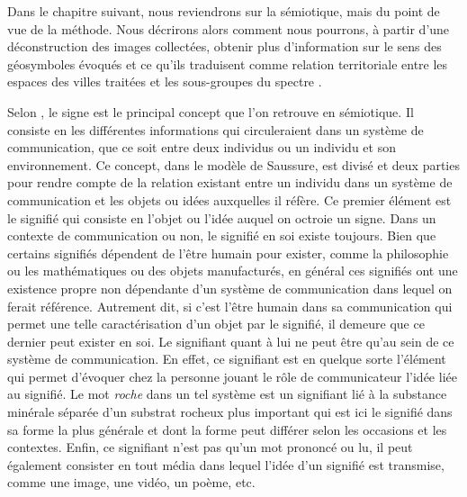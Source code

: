 Dans le chapitre suivant, nous reviendrons sur la sémiotique, mais du point de vue de la méthode. 
Nous décrirons alors comment nous pourrons, à partir d'une déconstruction des images collectées, obtenir plus d'information sur le sens des géosymboles évoqués et ce qu'ils traduisent comme relation territoriale entre les espaces des villes traitées et les sous-groupes du spectre \lgbt{}.

Selon \citet[113][]{Rose2012}, le signe est le principal concept que l'on retrouve en sémiotique. 
Il consiste en les différentes informations qui circuleraient dans un système de communication, que ce soit entre deux individus ou un individu et son environnement. 
Ce concept, dans le modèle de Saussure, est divisé et deux parties pour rendre compte de la relation existant entre un individu dans un système de communication et les objets ou idées auxquelles il réfère. 
Ce premier élément est le signifié qui consiste en l'objet ou l'idée auquel on octroie un signe. 
Dans un contexte de communication ou non, le signifié en soi existe toujours. 
Bien que certains signifiés dépendent de l'être humain pour exister, comme la philosophie ou les mathématiques ou des objets manufacturés, en général ces signifiés ont une existence propre non dépendante d'un système de communication dans lequel on ferait référence. 
Autrement dit, si c'est l'être humain dans sa communication qui permet une telle caractérisation d'un objet par le signifié, il demeure que ce dernier peut exister en soi. 
Le signifiant quant à lui ne peut être qu'au sein de ce système de communication. 
En effet, ce signifiant est en quelque sorte l'élément qui permet d'évoquer chez la personne jouant le rôle de communicateur l'idée liée au signifié. 
Le mot \emph{roche} dans un tel système est un signifiant lié à la substance minérale séparée d'un substrat rocheux plus important qui est ici le signifié dans sa forme la plus générale et dont la forme peut différer selon les occasions et les contextes. 
Enfin, ce signifiant n'est pas qu'un mot prononcé ou lu, il peut également consister en tout média dans lequel l'idée d'un signifié est transmise, comme une image, une vidéo, un poème, etc.

